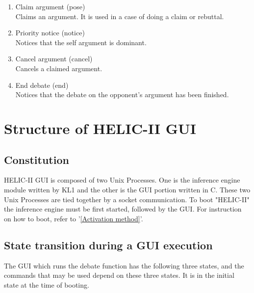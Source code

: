 \begin{enumerate}

\item Claim argument (pose)\\
         Claims an argument.  It is used in a case of doing a claim or rebuttal.
\item Priority notice (notice)\\
         Notices that the self argument is dominant.
\item Cancel argument (cancel)\\
         Cancels a claimed argument.
\item End debate (end)\\
         Notices that the debate on the opponent's argument has been finished.

\end{enumerate}

\section{Structure of HELIC-II GUI}

\subsection{Constitution}

HELIC-II GUI is composed of two Unix Processes.
One is the inference engine module written by KL1 and the other is the GUI portion written in C.
These two Unix Processes are tied together by a socket communication.
To boot "HELIC-II" the inference engine must be first started, followed by the  GUI.
For instruction on how to boot, refer to '\ref{Activation method}'.

\subsection{State transition during a GUI execution}

The GUI which runs the debate function has the following three states, and the commands that may be used depend on these three states.
It is in the initial state at the time of booting.


